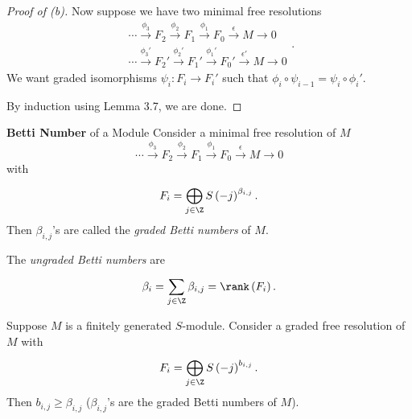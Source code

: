 \documentclass[co439]{subfiles}
\begin{document}
    \begin{proof}[Proof of (b)]
        Now suppose we have two minimal free resolutions
        \begin{equation*}
            \begin{aligned}
                \cdots \overset{\phi_3}{\to} F_2 \overset{\phi_2}{\to} F_1 \overset{\phi_1}{\to} F_0 \overset{\epsilon}{\to} M\to 0 \\
                \cdots \overset{\phi_3'}{\to} F_2' \overset{\phi_2'}{\to} F_1' \overset{\phi_1'}{\to} F_0' \overset{\epsilon'}{\to} M\to 0
            \end{aligned} .
        \end{equation*}
        We want graded isomorphisms $\psi_i:F_i\to F_i'$ such that $\phi_i\circ\psi_{i-1} = \psi_i\circ\phi_i'$.

        By induction using Lemma 3.7, we are done.
    \end{proof}
    
    \begin{definition}{\textbf{Betti Number} of a Module}
        Consider a minimal free resolution of $M$ 
        \begin{equation*}
            \cdots \overset{\phi_3}{\to} F_2 \overset{\phi_2}{\to} F_1 \overset{\phi_1}{\to} F_0 \overset{\epsilon}{\to} M\to 0
        \end{equation*}
        with
        \begin{equation*}
            F_i = \bigoplus^{}_{j\in\Z} S\left( -j \right)^{\beta_{i,j}}.
        \end{equation*}
        Then $\beta_{i,j}$'s are called the \emph{graded Betti numbers} of $M$.

        The \emph{ungraded Betti numbers} are
        \begin{equation*}
            \beta_i = \sum^{}_{j\in\Z} \beta_{i,j} = \rank\left( F_i \right).
        \end{equation*}
    \end{definition}
    
    \begin{theorem}{}
        Suppose $M$ is a finitely generated $S$-module. Consider a graded free resolution of $M$ with
        \begin{equation*}
            F_i = \bigoplus^{}_{j\in\Z}S\left( -j \right)^{b_{i,j}}.
        \end{equation*}
        Then $b_{i,j}\geq\beta_{i,j}$ ($\beta_{i,j}$'s are the graded Betti numbers of $M$).
    \end{theorem}
\end{document}
